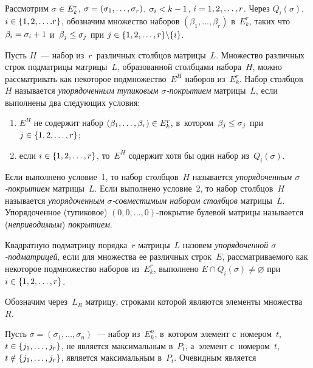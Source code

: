 \begin{multicols}{2}
    Рассмотрим $\sigma \hm\in E_k^r$, $\sigma\hm=(\sigma_1,\ldots, \sigma_r)$, 
$\sigma_i\hm<k\hm-1$, $i\hm=1,2,\ldots, r$. Через $Q_i(\sigma)$, $i\hm\in 
\{1,2,\ldots. r\}$, обозначим множество наборов $(\beta_1,\ldots, \beta_r)$ 
в~$E_k^r$, таких что $\beta_i\hm=\sigma_i\hm+1$ и~$\beta_j\hm\leq \sigma_j$ 
при $j\hm\in \{1,2,\ldots, r\}\backslash \{i\}$. 
    
    Пусть $H$~--- набор из~$r$~различных столбцов мат\-ри\-цы~$L$. 
Множество различных строк под\-мат\-ри\-цы мат\-ри\-цы~$L$, образованной 
столб\-ца\-ми набора~$H$, мож\-но рас\-смат\-ри\-вать как некоторое 
подмножество~$E^H$ наборов из~$E_k^r$. Набор столбцов~$H$ называется 
\textit{упорядоченным тупиковым $\sigma$-по\-кры\-ти\-ем} мат\-ри\-цы~$L$, 
если выполнены два сле\-ду\-ющих условия:
\begin{enumerate}[(1)]
\item $E^H$ не содержит набор 
$(\beta_1, \ldots, \beta_r)\hm\in E_k^r$, в~котором~$\beta_j\hm\leq \sigma_j$ при 
$j\hm\in \{1,2,\ldots, r\}$; 
 \item если $i\hm\in \{1,2,\ldots, r\}$, то~$E^H$ содержит 
хотя бы один набор из~$Q_i(\sigma)$.
\end{enumerate}
   
    Если выполнено условие~1, то набор столбцов~$H$ называется 
\textit{упорядоченным $\sigma$-по\-кры\-ти\-ем} матрицы~$L$. Если 
выполнено условие~2, то набор столбцов~$H$ называется 
\textit{упорядоченным $\sigma$-со\-вмести\-мым набором столбцов} 
матрицы~$L$. Упорядоченное (тупиковое) $(0, 0,\ldots, 0)$-по\-кры\-тие 
булевой матрицы называется (\textit{неприводимым}) \textit{покрытием}. 
    
    Квадратную подматрицу порядка~$r$ матрицы~$L$ назовем 
\textit{упорядоченной $\sigma$-под\-мат\-ри\-цей}, если для множества ее 
различных строк~$E$, рас\-смат\-ри\-ва\-емо\-го как некоторое подмножество наборов 
из~$E_k^r$, выполнено $E\cap Q_i(\sigma)\not= \varnothing$ при $i\hm\in 
\{1,2,\ldots, r\}$. 
    
    Обозначим через~$L_R$ матрицу, строками которой являются элементы 
множества~$R$. 
    
    Пусть $\sigma=(\sigma_1,\ldots, \sigma_n)$~--- набор из~$E_k^n$, 
в~котором элемент с~номером~$t$, $t\hm\in \{j_1,\ldots, j_r\}$, не является 
максимальным в~$P_t$, а~элемент с~номером~$t$, $t\hm\notin \{j_1, \ldots, 
j_r\}$, является максимальным в~$P_t$. Очевидным является
    
    \smallskip
    

\end{multicols}
